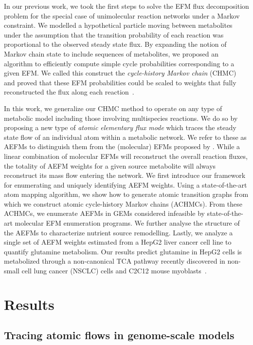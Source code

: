 \documentclass[12pt]{article}
\begin{document}
In our previous work, we took the first steps to solve the EFM flux
decomposition problem for the special case of unimolecular reaction
networks under a Markov constraint. We modelled a hypothetical particle
moving between metabolites under the assumption that the transition
probability of each reaction was proportional to the observed steady state
flux. By expanding the notion of Markov chain state to include sequences
of metabolites, we proposed an algorithm to efficiently compute simple
cycle probabilities corresponding to a given EFM. We called this construct
the \emph{cycle-history Markov chain} (CHMC) and proved that these EFM
probabilities could be scaled to weights that fully reconstructed the flux
along each reaction~\citep{ChitpinJustinG2023AMct}.

In this work, we generalize our CHMC method to operate on any type of
metabolic model including those involving multispecies reactions. We do so
by proposing a new type of \emph{atomic elementary flux mode} which
traces the steady state flow of an individual atom within a metabolic
network. We refer to these as AEFMs to distinguish them from the
(molecular) EFMs proposed by \citeauthor{SchusterStefan1994Oefm}. While
a linear combination of molecular EFMs will reconstruct the overall reaction
fluxes, the totality of AEFM weights for a given source metabolite will always
reconstruct its mass flow entering the network. We first introduce our
framework for enumerating and uniquely identifying AEFM weights. Using
a state-of-the-art atom mapping algorithm, we show how to generate atomic
transition graphs from which we construct atomic cycle-history Markov chains
(ACHMCs). From these ACHMCs, we enumerate AEFMs in GEMs considered infeasible
by state-of-the-art molecular EFM enumeration programs. We further analyse the
structure of the AEFMs to characterize nutrient source remodelling. Lastly, we
analyze a single set of AEFM weights estimated from a HepG2 liver cancer cell
line to quantify glutamine metabolism. Our results predict glutamine in HepG2
cells is metabolized through a non-canonical TCA pathway recently discovered in
non-small cell lung cancer (NSCLC) cells and C2C12 mouse
myoblasts~\citep{ArnoldPaigeK2022Anta}.

\section*{Results}

\subsection*{Tracing atomic flows in genome-scale models} %
\end{document}
